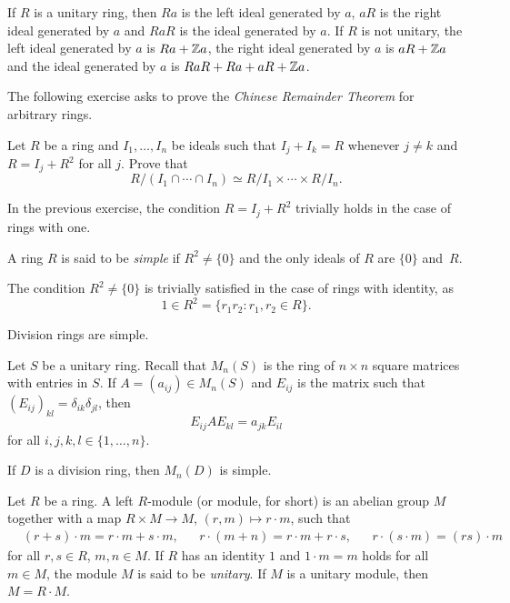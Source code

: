 \begin{example}
	If $R$ is a unitary ring, then $Ra$ is the left ideal generated by $a$, $aR$ is
	the right ideal generated by $a$ and $RaR$ is the ideal generated by $a$. 
	If $R$ is not unitary, the left ideal generated by $a$ is $Ra+\mathbb{Z} a$,
	the right ideal generated by $a$ is $aR+\mathbb{Z} a$ and the ideal generated by 
	$a$ is $RaR+Ra+aR+\mathbb{Z} a$.
\end{example}

The following exercise asks to prove the \emph{Chinese Remainder Theorem}  
for arbitrary rings.

\begin{bonus}
    \label{xca:chinese}
    Let $R$ be a ring and $I_1,\dots,I_n$ be ideals such that 
    $I_j+I_k=R$ whenever $j\ne k$ and $R=I_j+R^2$ for all $j$. Prove that 
    \[
    R/(I_1\cap\cdots\cap I_n)\simeq R/I_1\times\cdots\times R/I_n.
    \]
\end{bonus}

In the previous exercise, the condition $R=I_j+R^2$ trivially holds in the case of rings with one. 

\begin{definition}
A ring $R$ is said to be \emph{simple} if $R^2\ne\{0\}$ and the only ideals of 
$R$ are $\{0\}$ and~$R$.  
\end{definition}

The condition $R^2\ne\{0\}$ is trivially satisfied in the case of rings
with identity, as 
\[
1\in R^2=\{r_1r_2:r_1,r_2\in R\}.
\]

\begin{example}
	Division rings are simple.
\end{example}

Let $S$ be a unitary ring. Recall that $M_n(S)$ is the ring of $n\times n$ square matrices 
with entries in $S$.  If $A=(a_{ij})\in M_n(S)$ and $E_{ij}$ is the matrix
such that $(E_{ij})_{kl}=\delta_{ik}\delta_{jl}$, then
\begin{equation}
	\label{eq:trick}
E_{ij}AE_{kl}=a_{jk}E_{il}
\end{equation}
for all $i,j,k,l\in\{1,\dots,n\}$. 

\begin{example}
	If $D$ is a division ring, then $M_n(D)$ is simple. 
\end{example}

Let $R$ be a ring. A left $R$-module (or module, for short)  
is an abelian group $M$ together with a map $R\times M\to M$, $(r,m)\mapsto r\cdot m$, such that
\begin{align*}
	&(r+s)\cdot m=r\cdot m+s\cdot m, &&
	r\cdot (m+n)=r\cdot m+r\cdot s, && r\cdot (s\cdot m)=(rs)\cdot m    
\end{align*}
for all $r,s\in R$, $m,n\in M$.  If $R$ has an identity 
$1$ and $1\cdot m=m$ holds for all $m\in M$, the module $M$ is said to be 
\emph{unitary}.  If $M$ is a unitary module, then $M=R\cdot M$. %

